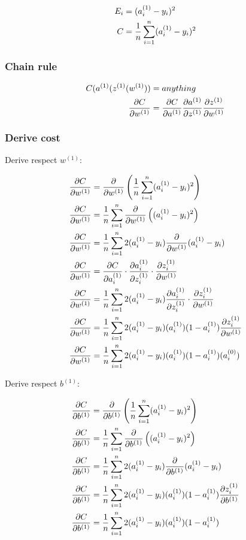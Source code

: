 \documentclass{article}
\begin{document}
\begin{align}
E_i &= (a_i^{(1)} - y_i)^2 \\
C &= \avgsum[i,n] (a_i^{(1)} - y_i)^2
\end{align}

\subsubsection{Chain rule}

\begin{align}
C(a^{(1)}(z^{(1)}(w^{(1)})) &= anything \\
\frac{\partial C}{\partial w^{(1)}} &= \frac{\partial C}{\partial a^{(1)}} \frac{\partial a^{(1)}}{\partial z^{(1)}} \frac{\partial z^{(1)}}{\partial w^{(1)}}\\
\end{align}

\pagebreak

\subsubsection{Derive cost}

Derive respect $w^{(1)}$:

\begin{align}
\pd{C}{w^{(1)}} &= \pd{}{w^{(1)}}\left(\avgsum[i,n](a_i^{(1)} - y_i)^2\right) \\
\pd{C}{w^{(1)}} &= \avgsum[i,n]\pd{}{w^{(1)}}\left((a_i^{(1)} - y_i)^2\right) \\
\pd{C}{w^{(1)}} &= \avgsum[i,n]2(a_i^{(1)} - y_i)\pd{}{w^{(1)}}(a_i^{(1)} - y_i) \\
\pd{C}{w^{(1)}} &= \pd{C}{a_i^{(1)}}\cdot\pd{a_i^{(1)}}{z_i^{(1)}}\cdot\pd{z_i^{(1)}}{w^{(1)}} \\
\pd{C}{w^{(1)}} &= \avgsum[i,n]2(a_i^{(1)} - y_i)\pd{a_i^{(1)}}{z_i^{(1)}}\cdot\pd{z_i^{(1)}}{w^{(1)}} \\
\pd{C}{w^{(1)}} &= \avgsum[i,n]2(a_i^{(1)} - y_i)(a_i^{(1)})(1-a_i^{(1)})\pd{z_i^{(1)}}{w^{(1)}} \\
\pd{C}{w^{(1)}} &= \avgsum[i,n]2(a_i^{(1)} - y_i)(a_i^{(1)})(1-a_i^{(1)})(a_i^{(0)}) \\
\end{align}

Derive respect $b^{(1)}$:

\begin{align}
\pd{C}{b^{(1)}} &= \pd{}{b^{(1)}}\left(\avgsum[i,n](a_i^{(1)} - y_i)^2\right) \\
\pd{C}{b^{(1)}} &= \avgsum[i,n]\pd{}{b^{(1)}}\left((a_i^{(1)} - y_i)^2\right) \\
\pd{C}{b^{(1)}} &= \avgsum[i,n]2(a_i^{(1)} - y_i)\pd{}{b^{(1)}}(a_i^{(1)} - y_i) \\
\pd{C}{b^{(1)}} &= \avgsum[i,n]2(a_i^{(1)} - y_i)(a_i^{(1)})(1-a_i^{(1)})\pd{z_i^{(1)}}{b^{(1)}} \\
\pd{C}{b^{(1)}} &= \avgsum[i,n]2(a_i^{(1)} - y_i)(a_i^{(1)})(1-a_i^{(1)}) \\
\end{align}
\end{document}
